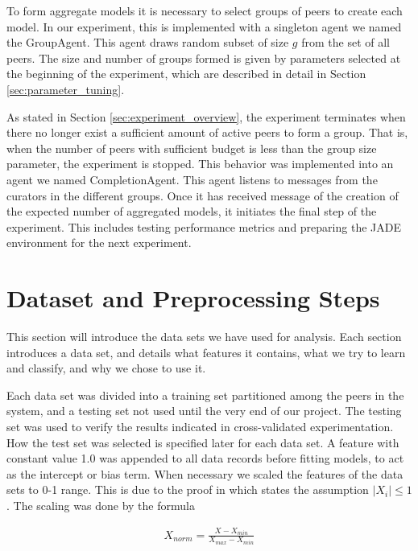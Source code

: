To form aggregate models it is necessary to select groups of peers to create each model. In our experiment, this is implemented with a singleton agent we named the GroupAgent. This agent draws random subset of size $g$ from the set of all peers. The size and number of groups formed is given by parameters selected at the beginning of the experiment, which are described in detail in Section \ref{sec:parameter_tuning}. 

As stated in Section \ref{sec:experiment_overview},  the experiment terminates when there no longer exist a sufficient amount of active peers to form a group. That is, when the number of peers with sufficient budget is less than the group size parameter, the experiment is stopped. This behavior was implemented into an agent we named CompletionAgent. This agent listens to messages from the curators in the different groups. Once it has received message of the creation of the expected number of aggregated models, it initiates the final step of the experiment. This includes testing performance metrics and preparing the JADE environment for the next experiment. 


\section{Dataset and Preprocessing Steps}
\label{sec:data sets}
This section will introduce the data sets we have used for analysis. Each section introduces a data set, and details what features it contains, what we try to learn and classify, and why we chose to use it.

Each data set was divided into a training set partitioned among the peers in the system, and a testing set not used until the very end of our project. The testing set was used to verify the results indicated in cross-validated experimentation. How the test set was selected is specified later for each data set.
A feature with constant value 1.0 was appended to all data records before fitting models, to act as the intercept or bias term. When necessary we scaled the features of the data sets to 0-1 range. This is due to the proof in \citep{chaudhuri2009logistic} which states the assumption $|X_i|\leq 1$. The scaling was done by the formula

\begin{eqnarray}
X_{norm} = \frac{X-X_{min}}{X_{max} - X_{min}}
\end{eqnarray}

